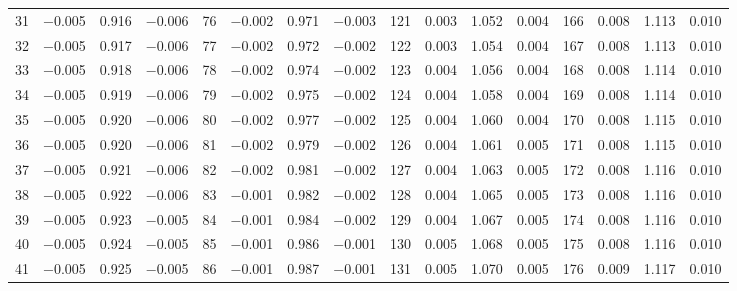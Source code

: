 \begin{table}[!h]
{\begin{tabular}{rrrr|rrrr|rrrr|crrr}
 31 & \tiny{ $-$0.005} &   0.916 & \tiny{ $-$0.006} &  76 & \tiny{ $-$0.002} &   0.971 & \tiny{ $-$0.003} & 121 & \tiny{  0.003} &   1.052 & \tiny{  0.004} & 166 & \tiny{  0.008} &   1.113 & \tiny{  0.010}\\
 32 & \tiny{ $-$0.005} &   0.917 & \tiny{ $-$0.006} &  77 & \tiny{ $-$0.002} &   0.972 & \tiny{ $-$0.002} & 122 & \tiny{  0.003} &   1.054 & \tiny{  0.004} & 167 & \tiny{  0.008} &   1.113 & \tiny{  0.010}\\
 33 & \tiny{ $-$0.005} &   0.918 & \tiny{ $-$0.006} &  78 & \tiny{ $-$0.002} &   0.974 & \tiny{ $-$0.002} & 123 & \tiny{  0.004} &   1.056 & \tiny{  0.004} & 168 & \tiny{  0.008} &   1.114 & \tiny{  0.010}\\
 34 & \tiny{ $-$0.005} &   0.919 & \tiny{ $-$0.006} &  79 & \tiny{ $-$0.002} &   0.975 & \tiny{ $-$0.002} & 124 & \tiny{  0.004} &   1.058 & \tiny{  0.004} & 169 & \tiny{  0.008} &   1.114 & \tiny{  0.010}\\
 35 & \tiny{ $-$0.005} &   0.920 & \tiny{ $-$0.006} &  80 & \tiny{ $-$0.002} &   0.977 & \tiny{ $-$0.002} & 125 & \tiny{  0.004} &   1.060 & \tiny{  0.004} & 170 & \tiny{  0.008} &   1.115 & \tiny{  0.010}\\
 36 & \tiny{ $-$0.005} &   0.920 & \tiny{ $-$0.006} &  81 & \tiny{ $-$0.002} &   0.979 & \tiny{ $-$0.002} & 126 & \tiny{  0.004} &   1.061 & \tiny{  0.005} & 171 & \tiny{  0.008} &   1.115 & \tiny{  0.010}\\
 37 & \tiny{ $-$0.005} &   0.921 & \tiny{ $-$0.006} &  82 & \tiny{ $-$0.002} &   0.981 & \tiny{ $-$0.002} & 127 & \tiny{  0.004} &   1.063 & \tiny{  0.005} & 172 & \tiny{  0.008} &   1.116 & \tiny{  0.010}\\
 38 & \tiny{ $-$0.005} &   0.922 & \tiny{ $-$0.006} &  83 & \tiny{ $-$0.001} &   0.982 & \tiny{ $-$0.002} & 128 & \tiny{  0.004} &   1.065 & \tiny{  0.005} & 173 & \tiny{  0.008} &   1.116 & \tiny{  0.010}\\
 39 & \tiny{ $-$0.005} &   0.923 & \tiny{ $-$0.005} &  84 & \tiny{ $-$0.001} &   0.984 & \tiny{ $-$0.002} & 129 & \tiny{  0.004} &   1.067 & \tiny{  0.005} & 174 & \tiny{  0.008} &   1.116 & \tiny{  0.010}\\
 40 & \tiny{ $-$0.005} &   0.924 & \tiny{ $-$0.005} &  85 & \tiny{ $-$0.001} &   0.986 & \tiny{ $-$0.001} & 130 & \tiny{  0.005} &   1.068 & \tiny{  0.005} & 175 & \tiny{  0.008} &   1.116 & \tiny{  0.010}\\
 41 & \tiny{ $-$0.005} &   0.925 & \tiny{ $-$0.005} &  86 & \tiny{ $-$0.001} &   0.987 & \tiny{ $-$0.001} & 131 & \tiny{  0.005} &   1.070 & \tiny{  0.005} & 176 & \tiny{  0.009} &   1.117 & \tiny{  0.010}\\

\end{tabular}}
\end{table}
